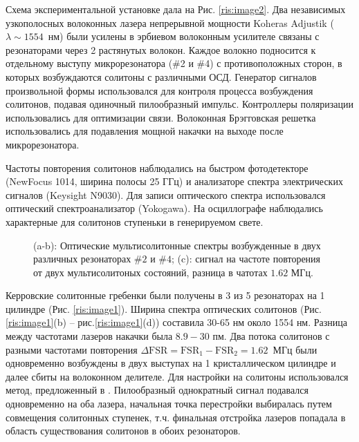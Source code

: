 Схема экспериментальной установке дала на Рис. \ref{ris:image2}.  Два независимых узкополосных волоконных лазера непрерывной мощности Koheras Adjustik ($\lambda \sim 1554$~нм) были усилены в эрбиевом волоконным усилителе связаны с резонаторами через 2 растянутых волокон. Каждое волокно подносится к отдельному выступу микрорезонатора (\#2 и \#4) с противоположных сторон, в которых возбуждаются солитоны с различными ОСД. Генератор сигналов произвольной формы использовался для контроля процесса возбуждения солитонов, подавая одиночный пилообразный импульс. Контроллеры поляризации использовались для оптимизации связи. Волоконная Брэгговская решетка использовались для подавления мощной накачки на выходе после микрорезонатора.

Частоты повторения солитонов наблюдались на быстром фотодетекторе (NewFocus 1014, ширина полосы 25 ГГц) и анализаторе спектра электрических сигналов (Keysight N9030). Для записи оптического спектра использовался оптический спектроанализатор (Yokogawa). На осциллографе наблюдались характерные для солитонов ступеньки в генерируемом свете.

\begin{figure}[ht]
\begin{minipage}[ht]{1\linewidth}
\end{minipage}
\caption{(a-b): Оптические мультисолитонные спектры возбужденные в двух различных резонаторах $\#2$ и $\#4$; (c): сигнал на частоте повторения от двух мультисолитоных состояний, разница в чатотах $1.62$ МГц.}
\label{ris:image3}
\end{figure}


Керровские солитонные гребенки были получены в 3 из 5 резонаторах на 1 цилиндре (Рис. \ref{ris:image1}). Ширина спектра оптических солитонов (Рис.\ref{ris:image1}(b) -- рис.\ref{ris:image1}(d)) составила 30-65 нм около 1554 нм. Разница между частотами лазеров накачки была $8.9-30$ пм. Два потока солитонов с разными частотами повторения $\Delta\mbox{FSR} = \mbox{FSR}_1 - \mbox{FSR}_2 = 1.62$~МГц были одновременно возбуждены в двух выступах на 1 кристаллическом цилиндре и далее сбиты на волоконном делителе. Для настройки на солитоны использовался метод, предложенный в \cite{Herr2014}. Пилообразный однократный сигнал подавался одновременно на оба лазера, начальная точка перестройки выбиралась путем совмещения солитонных ступенек, т.ч. финальная отстройка лазеров попадала в область существования солитонов в обоих резонаторов.

